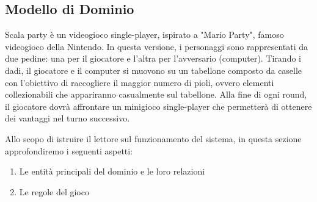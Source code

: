 \subsection{Modello di Dominio}
Scala party è un videogioco single-player, ispirato a "Mario Party",
famoso videogioco della Nintendo. In questa versione, i personaggi 
sono rappresentati da due pedine: una per il giocatore e l'altra per
l'avversario (computer). Tirando i dadi, il giocatore e il computer 
si muovono su un tabellone composto da caselle con l'obiettivo di
raccogliere il maggior numero di pioli, ovvero elementi collezionabili
che appariranno casualmente sul tabellone. Alla fine di ogni round,
il giocatore dovrà affrontare un minigioco single-player che permetterà
di ottenere dei vantaggi nel turno successivo.


Allo scopo di istruire il lettore sul funzionamento del sistema,
in questa sezione approfondiremo i seguenti aspetti:
\begin{enumerate}
    \item Le entità principali del dominio e le loro relazioni
    \item Le regole del gioco
\end{enumerate}
